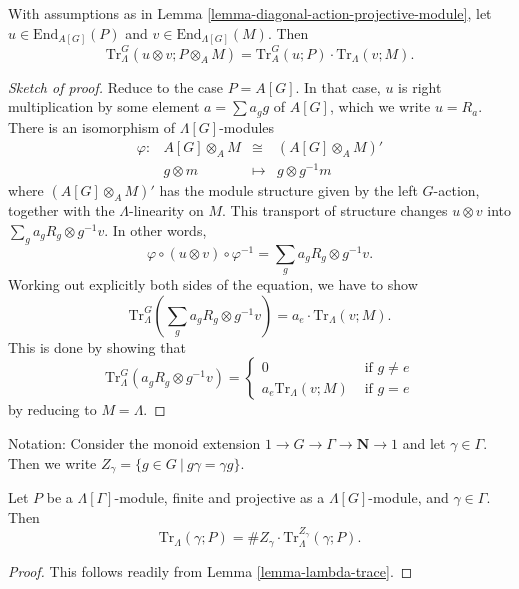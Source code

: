 \begin{lemma}
\label{lemma-multiplicative-trace}
With assumptions as in
Lemma \ref{lemma-diagonal-action-projective-module},
let
$u\in \text{End}_{A[G]}(P)$ and $v\in \text{End}_{\Lambda[G]}(M)$. Then
$$
\text{Tr}_\Lambda^G \left(u \otimes v; P \otimes_A M\right) = \text{Tr}_A^G(u;
P)\cdot \text{Tr}_\Lambda(v;M).
$$
\end{lemma}

\begin{proof}[Sketch of proof]
Reduce to the case $P=A[G]$. In that case, $u$ is right multiplication by some
element $a = \sum a_gg$ of $A[G]$, which we write $u = R_a$. There is an
isomorphism of $\Lambda[G]$-modules
$$
\begin{matrix}
\varphi: & A[G]\otimes_A M & \cong & \left(A[G]\otimes_A M\right)'\\
& g \otimes m & \longmapsto & g \otimes g^{-1}m
\end{matrix}
$$
where $\left(A[G]\otimes_A M\right)'$ has the module structure given by the
left $G$-action, together with the $\Lambda$-linearity on $M$. This transport
of structure changes $u \otimes v$ into $\sum_ga_gR_g \otimes g^{-1}v$. In other
words,
$$
\varphi \circ (u \otimes v) \circ \varphi^{-1}
=
\sum_ga_gR_g \otimes g^{-1}v.
$$
Working out explicitly both sides of the equation, we have to show
$$
\text{Tr}_\Lambda^G\left(\sum_g a_gR_g \otimes g^{-1}v\right) = a_e\cdot
\text{Tr}_\Lambda(v; M).
$$
This is done by showing that
$$
\text{Tr}_\Lambda^G\left(a_gR_g \otimes g^{-1}v\right) =
\left\{
\begin{matrix}
0 & \text{ if } g\neq e\\
a_e\text{Tr}_\Lambda\left(v; M\right) & \text{ if }g=e
\end{matrix}
\right.
$$
by reducing to $M=\Lambda$.
\end{proof}

\noindent
Notation:
Consider the monoid extension $1 \to G\to \Gamma\to \mathbf{N} \to 1$ and let
$\gamma\in \Gamma$.
Then we write $Z_\gamma = \{g\in G\ | \ g\gamma=\gamma g\}$.

\begin{lemma}
\label{lemma-gamma-z-gamma-trace}
Let $P$ be a $\Lambda[\Gamma]$-module, finite and projective as a
$\Lambda[G]$-module, and $\gamma \in \Gamma$. Then
$$
\text{Tr}_{\Lambda}(\gamma; P) =
\# Z_\gamma \cdot \text{Tr}_\Lambda^{Z_\gamma}\left(\gamma; P\right).
$$	
\end{lemma}

\begin{proof}
This follows readily from Lemma \ref{lemma-lambda-trace}.
\end{proof}

